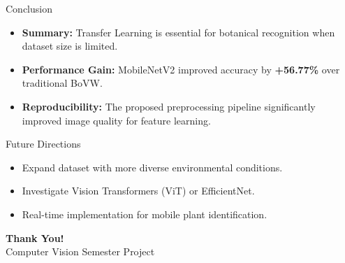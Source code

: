\documentclass[10pt]{beamer}
\begin{document}
\begin{frame}{Conclusion}
    \begin{itemize}
        \item \textbf{Summary:} Transfer Learning is essential for botanical recognition when dataset size is limited.
        \item \textbf{Performance Gain:} MobileNetV2 improved accuracy by \textbf{+56.77\%} over traditional BoVW.
        \item \textbf{Reproducibility:} The proposed preprocessing pipeline significantly improved image quality for feature learning.
    \end{itemize}
    \begin{block}{Future Directions}
        \begin{itemize}
            \item Expand dataset with more diverse environmental conditions.
            \item Investigate Vision Transformers (ViT) or EfficientNet.
            \item Real-time implementation for mobile plant identification.
        \end{itemize}
    \end{block}
\end{frame}

\begin{frame}
    \centering
    \Large \textbf{Thank You!}\\
    \vspace{2em}
    \footnotesize Computer Vision Semester Project
\end{frame}
\end{document}
